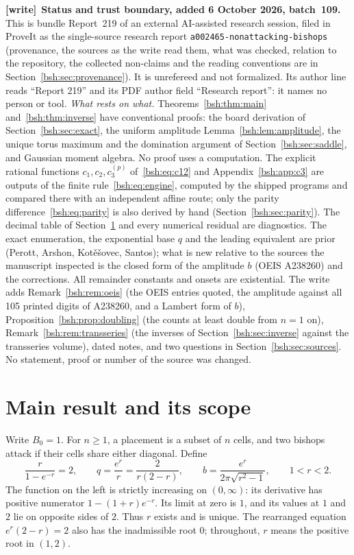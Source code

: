 \documentclass[11pt,letterpaper]{article}
\theoremstyle{remark}\newtheorem{remark}[theorem]{Remark}
\newcommand{\file}[1]{\nolinkurl{#1}}
\newenvironment{writenote}[1][]{\par\smallskip\begingroup\small
 \noindent\textbf{[write]}\if\relax\detokenize{#1}\relax\else~\textbf{#1.}\fi\ }%
 {\par\endgroup\smallskip}
\begin{document}
\begin{writenote}[Status and trust boundary, added 6 October 2026, batch~109]
This is bundle Report~219 of an external AI-assisted research session, filed
in ProveIt as the single-source research report
\file{a002465-nonattacking-bishops} (provenance, the sources as the write
read them, what was checked, relation to the repository, the collected
non-claims and the reading conventions are in
Section~\ref{bsh:sec:provenance}). It is unrefereed and not formalized. Its
author line reads ``Report 219'' and its PDF author field ``Research
report'': it names no person or tool. \emph{What rests on what.}
Theorems~\ref{bsh:thm:main} and~\ref{bsh:thm:inverse} have conventional
proofs: the board derivation of Section~\ref{bsh:sec:exact}, the uniform
amplitude Lemma~\ref{bsh:lem:amplitude}, the unique torus maximum and the
domination argument of Section~\ref{bsh:sec:saddle}, and Gaussian moment
algebra. No proof uses a computation. The explicit rational functions
$c_1,c_2,c_3^{(p)}$ of~\eqref{bsh:eq:c12} and Appendix~\ref{bsh:app:c3} are
outputs of the finite rule~\eqref{bsh:eq:engine}, computed by the shipped
programs and compared there with an independent affine route; only the
parity difference~\eqref{bsh:eq:parity} is also derived by hand
(Section~\ref{bsh:sec:parity}). The decimal table of
Section~\ref{bsh:sec:main} and every numerical residual are diagnostics.
The exact enumeration, the exponential base $q$ and the leading equivalent
are prior (Perott, Arshon, Kot\v e\v sovec, Santos); what is new relative to
the sources the manuscript inspected is the closed form of the amplitude
$b$ (OEIS A238260) and the corrections. All remainder constants and onsets
are existential. The write adds Remark~\ref{bsh:rem:oeis} (the OEIS entries
quoted, the amplitude against all 105 printed digits of A238260, and a Lambert
form of $b$), Proposition~\ref{bsh:prop:doubling} (the counts at least double
from $n=1$ on), Remark~\ref{bsh:rem:transseries} (the inverses of
Section~\ref{bsh:sec:inverse} against the transseries volume), dated notes,
and two questions in Section~\ref{bsh:sec:sources}. No statement, proof
or number of the source was changed.
\end{writenote}

\section{Main result and its scope}\label{bsh:sec:main}
Write $B_0=1$. For $n\geq1$, a placement is a subset of $n$ cells, and two bishops attack if their cells share either diagonal. Define
\begin{equation}\label{bsh:eq:rqb}
 \frac{r}{1-e^{-r}}=2,\qquad
 q=\frac{e^r}{r}=\frac{2}{r(2-r)},\qquad
 b=\frac{e^r}{2\pi\sqrt{r^2-1}},\qquad 1<r<2.
\end{equation}
The function on the left is strictly increasing on $(0,\infty)$: its derivative has positive numerator $1-(1+r)e^{-r}$. Its limit at zero is $1$, and its values at $1$ and $2$ lie on opposite sides of $2$. Thus $r$ exists and is unique. The rearranged equation $e^r(2-r)=2$ also has the inadmissible root $0$; throughout, $r$ means the positive root in $(1,2)$.
\end{document}
